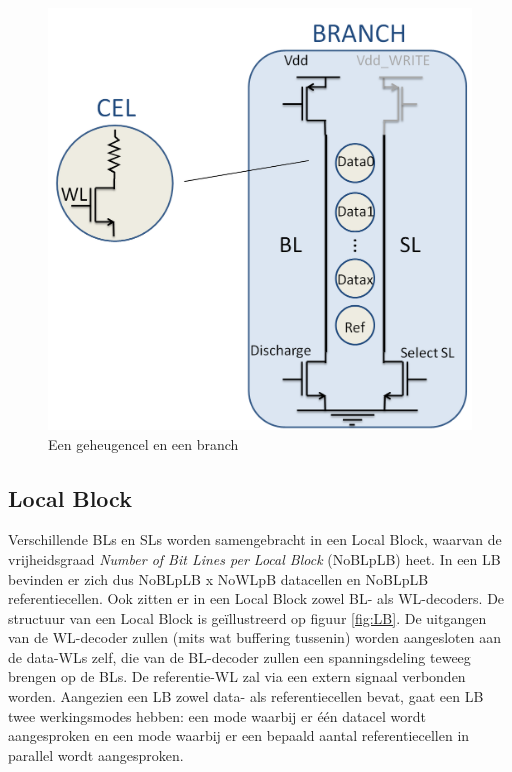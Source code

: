\begin{figure}
  \centering
  \includegraphics[scale=0.3]{../fig/hfdstk-architecture-cell-branch.png}
  \caption{Een geheugencel en een branch}
  \label{fig:cellbranch}
\end{figure}

\subsection{Local Block}
Verschillende BLs en SLs worden samengebracht in een Local Block, waarvan de vrijheidsgraad \emph{Number of Bit Lines per Local Block} (NoBLpLB) heet. In een LB bevinden er zich dus NoBLpLB x NoWLpB datacellen en NoBLpLB referentiecellen. Ook zitten er in een Local Block zowel BL- als WL-decoders.
De structuur van een Local Block is geïllustreerd op figuur \ref{fig:LB}.
De uitgangen van de WL-decoder zullen (mits wat buffering tussenin) worden aangesloten aan de data-WLs zelf, die van de BL-decoder zullen een spanningsdeling teweeg brengen op de BLs. De referentie-WL zal via een extern signaal verbonden worden.
Aangezien een LB zowel data- als referentiecellen bevat, gaat een LB twee werkingsmodes hebben: een mode waarbij er één datacel wordt aangesproken en een mode waarbij er een bepaald aantal referentiecellen in parallel wordt aangesproken.

